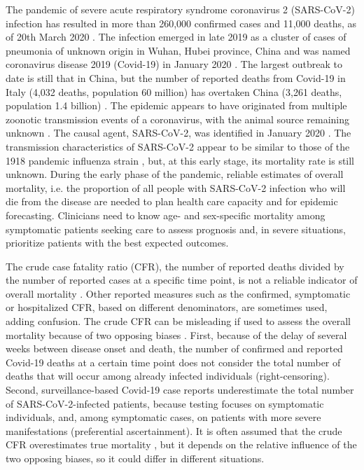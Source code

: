\documentclass{article}
\begin{document}
The pandemic of severe acute respiratory syndrome coronavirus 2 (SARS-CoV-2) infection has resulted in more than 260,000 confirmed cases and 11,000 deaths, as of 20th March 2020 \cite{whoreport61}. 
The infection emerged in late 2019 as a cluster of cases of pneumonia of unknown origin in Wuhan, Hubei province, China and was named coronavirus disease 2019 (Covid-19) in January 2020 \cite{wang2020novel,huang2020clinical}. 
The largest outbreak to date is still that in China, but the number of reported deaths from Covid-19 in Italy (4,032 deaths, population 60 million) has overtaken China (3,261 deaths, population 1.4 billion) \cite{whoreport61}. 
The epidemic appears to have originated from multiple zoonotic transmission events of a coronavirus, with the animal source remaining unknown \cite{jointmission}. 
The causal agent, SARS-CoV-2, was identified in January 2020 \cite{zhou2020pneumonia,gorbalenya2020severe}. 
The transmission characteristics of SARS-CoV-2 appear to be similar to those of the 1918 pandemic influenza strain \cite{riou2020pattern}, but, at this early stage, its mortality rate is still unknown. 
During the early phase of the pandemic, reliable estimates of overall mortality, i.e. the proportion of all people with SARS-CoV-2 infection who will die from the disease are needed to plan health care capacity and for epidemic forecasting. 
Clinicians need to know age- and sex-specific mortality among symptomatic patients seeking care to assess prognosis and, in severe situations, prioritize patients with the best expected outcomes. 

The crude case fatality ratio (CFR), the number of reported deaths divided by the number of reported cases at a specific time point, is not a reliable indicator of overall mortality \cite{whospeech,wang2020novel}. 
Other reported measures such as the confirmed, symptomatic or hospitalized CFR, based on different denominators, are sometimes used, adding confusion. 
The crude CFR can be misleading if used to assess the overall mortality because of two opposing biases \cite{Lipsitch2015,Battegay2020}. 
First, because of the delay of several weeks between disease onset and death, the number of confirmed and reported Covid-19 deaths at a certain time point does not consider the total number of deaths that will occur among already infected individuals (right-censoring). 
Second, surveillance-based Covid-19 case reports underestimate the total number of SARS-CoV-2-infected patients, because testing focuses on symptomatic individuals, and, among symptomatic cases, on patients with more severe manifestations (preferential ascertainment). 
It is often assumed that the crude CFR overestimates true mortality \cite{WorldHealthOrganization202046}, but it depends on the relative influence of the two opposing biases, so it could differ in different situations. 
\end{document}
